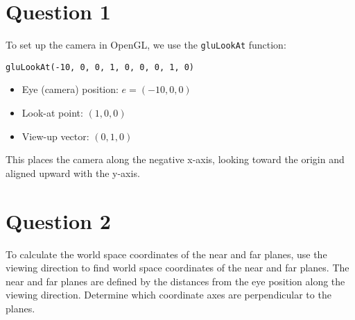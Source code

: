 \documentclass[12pt]{article}
\begin{document}
 \par
\medskip
{} \par
\medskip
{} \par
\medskip
{} \par
\medbreak

\section*{Question 1}
To set up the camera in OpenGL, we use the \texttt{gluLookAt} function:
\begin{verbatim}
gluLookAt(-10, 0, 0, 1, 0, 0, 0, 1, 0)
\end{verbatim}

\begin{itemize}
    \item Eye (camera) position: $e = (-10, 0, 0)$
    \item Look-at point: $(1, 0, 0)$
    \item View-up vector: $(0, 1, 0)$
\end{itemize}
This places the camera along the negative x-axis, looking toward the origin and aligned upward with the y-axis.

\begin{center}
\end{center}

\section*{Question 2}
To calculate the world space coordinates of the near and far planes, use the viewing direction to find world space coordinates of the near and far planes. 
The near and far planes are defined by the distances from the eye position along the viewing direction.
Determine which coordinate axes are perpendicular to the planes.
\medskip
\end{document}
